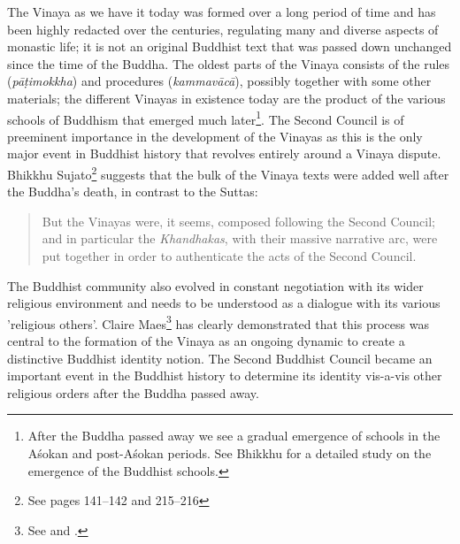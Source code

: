 The Vinaya as we have it today was formed over a long period of time and has been highly redacted over the centuries, regulating many and diverse aspects of monastic life; it is not an original Buddhist text that was passed down unchanged since the time of the Buddha. The oldest parts of the Vinaya consists of the rules ({\em pāṭimokkha}) and procedures ({\em kammavācā}), possibly together with some other materials; the different Vinayas in existence today are the product of the various schools of Buddhism that emerged much later\footnote{After the Buddha passed away we see a gradual emergence of schools in the Aśokan and post-Aśokan periods. See Bhikkhu \cite{sujato2012} for a detailed study on the emergence of the Buddhist schools.}. The Second Council is of preeminent importance in the development of the Vinayas as this is the only major event in Buddhist history that revolves entirely around a Vinaya dispute. Bhikkhu Sujato\footnote{See \cite{sujato2009} pages 141–142 and 215–216} suggests that the bulk of the Vinaya texts were added well after the Buddha's death, in contrast to the Suttas: 

\begin{quote}
But the Vinayas were, it seems, composed following the Second Council; and in particular the {\em Khandhakas}, with their massive narrative arc, were put together in order to authenticate the acts of the Second Council.
\end{quote}

The Buddhist community also evolved in constant negotiation with its wider religious environment and needs to be understood as a dialogue with its various 'religious others'. Claire Maes\footnote{See \cite{maes} and \cite{maes2016}.} has clearly demonstrated that this process was central to the formation of the Vinaya as an ongoing dynamic to create a distinctive Buddhist identity notion. The Second Buddhist Council became an important event in the Buddhist history to determine its identity vis-a-vis other religious orders after the Buddha passed away.

